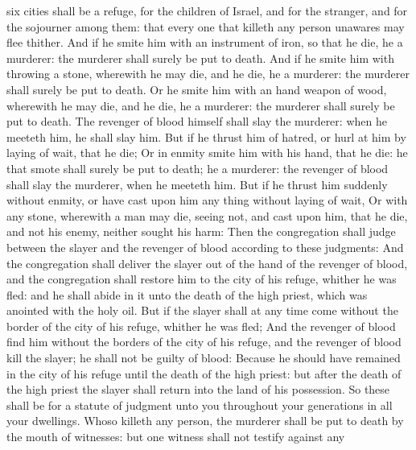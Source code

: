 {six
cities shall be a
refuge,
{} for the
children of
Israel, and for the
stranger, and for the
sojourner
among them: that every one that
killeth any
person
unawares may
flee thither.
And if he
smite him with an
instrument of
iron, so that he
die, he
{} a
murderer: the
murderer shall
surely be put to
death.
And if he
smite him with
throwing a
stone, wherewith he may
die, and he
die, he
{} a
murderer: the
murderer shall
surely be put to
death.
Or
{} he
smite him with an
hand
weapon of
wood, wherewith he may
die, and he
die, he
{} a
murderer: the
murderer shall
surely be put to
death.
The
revenger of
blood himself shall
slay the
murderer: when he
meeteth him,
he shall
slay him.
But if he
thrust him of
hatred, or
hurl at him by laying of
wait, that he
die;
Or in
enmity
smite him with his
hand, that he
die: he that
smote
{} shall
surely be put to
death;
{} he
{} a
murderer: the
revenger of
blood shall
slay the
murderer, when he
meeteth him.
But if he
thrust him
suddenly
without
enmity, or have
cast upon him any
thing without laying of
wait,
Or with any
stone, wherewith a man may
die,
seeing
{}
not, and
cast
{} upon him, that he
die, and
{} not his
enemy, neither
sought his
harm:
Then the
congregation shall
judge between the
slayer and the
revenger of
blood according to these
judgments:
And the
congregation shall
deliver the
slayer out of the
hand of the
revenger of
blood, and the
congregation shall
restore him to the
city of his
refuge, whither he was
fled: and he shall
abide in it unto the
death of the
high
priest, which was
anointed with the
holy
oil.
But if the
slayer shall at any
time
come without the
border of the
city of his
refuge, whither he was
fled;
And the
revenger of
blood
find him
without the
borders of the
city of his
refuge, and the
revenger of
blood
kill the
slayer; he shall not be guilty of
blood:
Because he should have
remained in the
city of his
refuge until the
death of the
high
priest: but
after the
death of the
high
priest the
slayer shall
return into the
land of his
possession.
So these
{} shall be for a
statute of
judgment unto you throughout your
generations in all your
dwellings.
Whoso
killeth any
person, the
murderer shall be put to
death by the
mouth of
witnesses: but
one
witness shall not
testify against any
}
